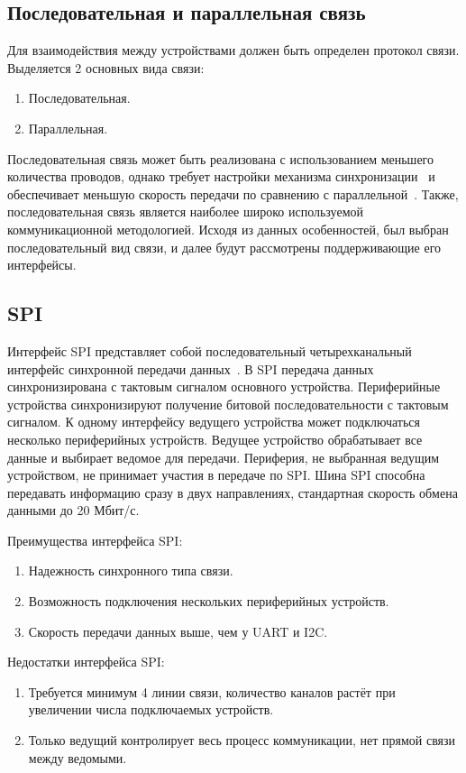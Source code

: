 \subsection{Последовательная и параллельная связь}
Для взаимодействия между устройствами должен быть определен протокол связи. Выделяется 2 основных вида связи:
\begin{enumerate}
	\item Последовательная.
	\item Параллельная.
\end{enumerate}

Последовательная связь может быть реализована с использованием меньшего количества проводов, однако требует настройки механизма синхронизации~\cite{bib4} и обеспечивает меньшую скорость передачи по сравнению с параллельной~\cite{bib7}. Также, последовательная связь является наиболее широко используемой коммуникационной методологией. Исходя из данных особенностей, был выбран последовательный вид связи, и далее будут рассмотрены поддерживающие его интерфейсы.

\subsection{SPI}
Интерфейс SPI представляет собой последовательный четырехканальный интерфейс синхронной передачи данных~\cite{bib5}. В SPI передача данных синхронизирована с тактовым сигналом основного устройства. Периферийные устройства синхронизируют получение битовой последовательности с тактовым сигналом. К одному интерфейсу ведущего устройства может подключаться несколько периферийных устройств. Ведущее устройство обрабатывает все данные и выбирает ведомое для передачи. Периферия, не выбранная ведущим устройством, не принимает участия в передаче по SPI. Шина SPI способна передавать информацию сразу в двух направлениях, стандартная скорость обмена данными до 20 Мбит/с.

Преимущества интерфейса SPI:
\begin{enumerate}
	\item Надежность синхронного типа связи.
	\item Возможность подключения нескольких периферийных устройств.
	\item Скорость передачи данных выше, чем у UART и I2C.
\end{enumerate}

Недостатки интерфейса SPI:
\begin{enumerate}
	\item Требуется минимум 4 линии связи, количество каналов растёт при увеличении числа подключаемых устройств.
	\item Только ведущий контролирует весь процесс коммуникации, нет прямой связи между ведомыми.
\end{enumerate}

